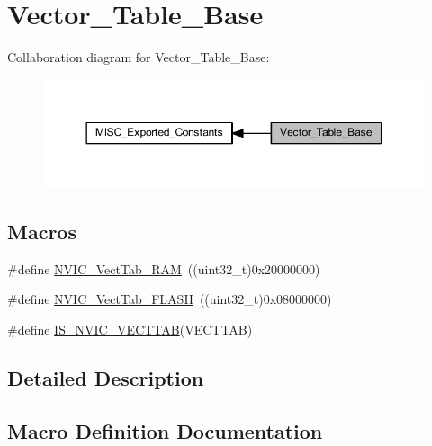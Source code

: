 \hypertarget{group___vector___table___base}{}\section{Vector\+\_\+\+Table\+\_\+\+Base}
\label{group___vector___table___base}
Collaboration diagram for Vector\+\_\+\+Table\+\_\+\+Base\+:
\nopagebreak
\begin{figure}[H]
\begin{center}
\leavevmode
\includegraphics[width=350pt]{group___vector___table___base}
\end{center}
\end{figure}
\subsection*{Macros}
\begin{DoxyCompactItemize}
\item 
\#define \hyperlink{group___vector___table___base_ga8be8181cc3e5d42f6204af306ab50f80}{N\+V\+I\+C\+\_\+\+Vect\+Tab\+\_\+\+R\+AM}~((uint32\+\_\+t)0x20000000)
\item 
\#define \hyperlink{group___vector___table___base_gafbf92fd28a1090b2aa49732ebd5704b5}{N\+V\+I\+C\+\_\+\+Vect\+Tab\+\_\+\+F\+L\+A\+SH}~((uint32\+\_\+t)0x08000000)
\item 
\#define \hyperlink{group___vector___table___base_ga26b9d493ccb98fcce9a27303078940c8}{I\+S\+\_\+\+N\+V\+I\+C\+\_\+\+V\+E\+C\+T\+T\+AB}(V\+E\+C\+T\+T\+AB)
\end{DoxyCompactItemize}


\subsection{Detailed Description}


\subsection{Macro Definition Documentation}
\mbox{\label{group___vector___table___base_ga26b9d493ccb98fcce9a27303078940c8}} 
